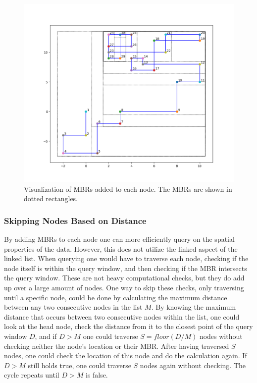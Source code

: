 \begin{figure}
	\centering
	\includegraphics[width=\textwidth]{figures/linked_MBRs_python_example.png}
	\caption{Visualization of MBRs added to each node. The MBRs are shown in dotted rectangles.}
	\label{fig:linked_mbr_list_in_python}
\end{figure}

\subsubsection{Skipping Nodes Based on Distance}
By adding MBRs to each node one can more efficiently query on the spatial properties of the data. However, this does not utilize the linked aspect of the linked list. When querying one would have to traverse each node, checking if the node itself is within the query window, and then checking if the MBR intersects the query window. These are not heavy computational checks, but they do add up over a large amount of nodes. One way to skip these checks, only traversing until a specific node, could be done by calculating the maximum distance between any two consecutive nodes in the list $M$. By knowing the maximum distance that occurs between two consecutive nodes within the list, one could look at the head node, check the distance from it to the closest point of the query window $D$, and if $D > M$ one could traverse $S = floor(D/M)$ nodes without checking neither the node's location or their MBR. After having traversed $S$ nodes, one could check the location of this node and do the calculation again. If $D > M$ still holds true, one could traverse $S$ nodes again without checking. The cycle repeats until $D > M$ is false.

